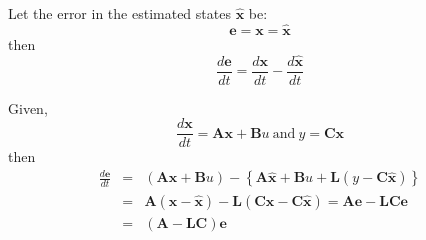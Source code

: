 Let the error in the estimated states $\hat{\mathbf{x}}$ be:
\[
\mathbf{e}=\mathbf{x}=\hat{\mathbf{x}}
\]
then
\[
\frac{d\mathbf{e}}{dt}=\frac{d\mathbf{x}}{dt}-\frac{d\hat{\mathbf{x}}}{dt}
\]

Given,
\[
\frac{d\mathbf{x}}{dt}=\mathbf{A}\mathbf{x}+\mathbf{B}u\ \mathrm{and}\ y=\mathbf{C}\mathbf{x}
\] 
then
\begin{eqnarray*}
	\frac{d\mathbf{e}}{dt} & = & \left(\mathbf{A}\mathbf{x}+\mathbf{B}u\right)-\left\{\mathbf{A}\hat{\mathbf{x}}+\mathbf{B}u+\mathbf{L}(y-\mathbf{C}\hat{\mathbf{x}})\right\} \\
	& = & \mathbf{A}(\mathbf{x}-\hat{\mathbf{x}})-\mathbf{L}(\mathbf{C}\mathbf{x}-\mathbf{C}\hat{\mathbf{x}}) = \mathbf{Ae}-\mathbf{LCe}\\
	& = & (\mathbf{A}-\mathbf{LC})\mathbf{e}
\end{eqnarray*}


\endinput

